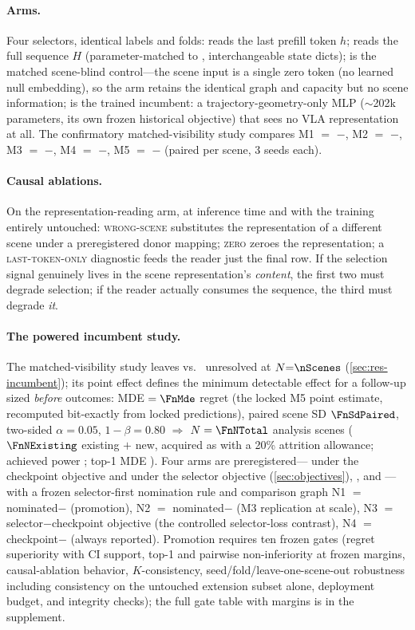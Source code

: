 \paragraph{Arms.}
Four selectors, identical labels and folds:
\Ltok{} reads the last prefill token $h$;
\Lfull{} reads the full sequence $H$ (parameter-matched to \Ltok, interchangeable state dicts);
\Lnull{} is the matched scene-blind control---the scene input is a single zero token (no learned null embedding), so the arm retains the identical graph and capacity but no scene information;
\Lgeo{} is the trained incumbent: a trajectory-geometry-only MLP ($\sim$202k parameters, its own frozen historical objective) that sees no VLA representation at all.
The confirmatory matched-visibility study compares
M1 $=$ \Lfull$-$\Ltok,
M2 $=$ \Lfull$-$\Lnull,
M3 $=$ \Ltok$-$\Lnull,
M4 $=$ \Lfull$-$\Lgeo,
M5 $=$ \Ltok$-$\Lgeo{}
(paired per scene, 3 seeds each).

\paragraph{Causal ablations.}
On the representation-reading arm, at inference time and with the training entirely untouched:
\textsc{wrong-scene} substitutes the representation of a different scene under a preregistered donor mapping;
\textsc{zero} zeroes the representation;
a \textsc{last-token-only} diagnostic feeds the \Lfull{} reader just the final row.
If the selection signal genuinely lives in the scene representation's \emph{content}, the first two must degrade selection; if the \Lfull{} reader actually consumes the sequence, the third must degrade \emph{it}.

\paragraph{The powered incumbent study.}
The matched-visibility study leaves \Ltok{} vs.\ \Lgeo{} unresolved at $N{=}\nScenes$ (\cref{sec:res-incumbent}); its point effect defines the minimum detectable effect for a follow-up sized \emph{before} outcomes: MDE $=\FnMde$ regret (the locked M5 point estimate, recomputed bit-exactly from locked predictions), paired scene SD $\FnSdPaired$, two-sided $\alpha=0.05$, $1-\beta=0.80$ $\Rightarrow$ $N=\FnNTotal$ analysis scenes ($\FnNExisting$ existing $+$ \FnNNewPreAttrition{} new, acquired as \FnNNew{} with a 20\% attrition allowance; achieved power \FnPowerAchieved; top-1 MDE \FnTopOneMde).
Four arms are preregistered---\Ltok{} under the checkpoint objective and under the selector objective (\cref{sec:objectives}), \Lnull, and \Lgeo---with a frozen selector-first nomination rule and comparison graph
N1 $=$ nominated$-$\Lgeo{} (promotion),
N2 $=$ nominated$-$\Lnull{} (M3 replication at scale),
N3 $=$ selector$-$checkpoint objective (the controlled selector-loss contrast),
N4 $=$ checkpoint$-$\Lgeo{} (always reported).
Promotion requires ten frozen gates (regret superiority with CI support, top-1 and pairwise non-inferiority at frozen margins, causal-ablation behavior, $K$-consistency, seed/fold/leave-one-scene-out robustness including consistency on the untouched extension subset alone, deployment budget, and integrity checks); the full gate table with margins is in the supplement.
